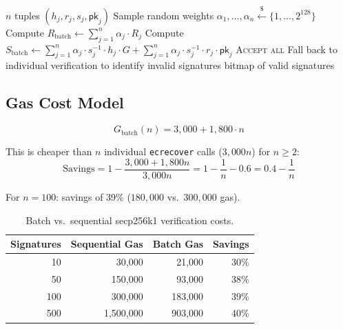\documentclass[11pt,a4paper]{article}
\begin{document}
\begin{algorithm}[H]
\caption{Secp256k1 Batch Signature Verification}
\label{alg:batch_ecdsa}
\begin{algorithmic}[1]
\Require $n$ tuples $(h_j, r_j, s_j, \mathsf{pk}_j)$
\State Sample random weights $\alpha_1, \ldots, \alpha_n \xleftarrow{\$} \{1, \ldots, 2^{128}\}$
\State Compute $R_{\text{batch}} \gets \sum_{j=1}^n \alpha_j \cdot R_j$ 
\State Compute $S_{\text{batch}} \gets \sum_{j=1}^n \alpha_j \cdot s_j^{-1} \cdot h_j \cdot G + \sum_{j=1}^n \alpha_j \cdot s_j^{-1} \cdot r_j \cdot \mathsf{pk}_j$
    \State \Return \textsc{Accept all}
\Else
    \State Fall back to individual verification to identify invalid signatures
    \State \Return bitmap of valid signatures
\EndIf
\end{algorithmic}
\end{algorithm}

\subsection{Gas Cost Model}

\begin{equation}
    G_{\text{batch}}(n) = 3{,}000 + 1{,}800 \cdot n
\end{equation}

This is cheaper than $n$ individual \texttt{ecrecover} calls ($3{,}000n$) for $n \geq 2$:
\begin{equation}
    \text{Savings} = 1 - \frac{3{,}000 + 1{,}800n}{3{,}000n} = 1 - \frac{1}{n} - 0.6 = 0.4 - \frac{1}{n}
\end{equation}

For $n = 100$: savings of 39\% ($180{,}000$ vs.\ $300{,}000$ gas).

\begin{table}[H]
\centering
\caption{Batch vs.\ sequential secp256k1 verification costs.}
\label{tab:batch_secp}
\begin{tabular}{rrrr}
\toprule
\textbf{Signatures} & \textbf{Sequential Gas} & \textbf{Batch Gas} & \textbf{Savings} \\
\midrule
10 & 30,000 & 21,000 & 30\% \\
50 & 150,000 & 93,000 & 38\% \\
100 & 300,000 & 183,000 & 39\% \\
500 & 1,500,000 & 903,000 & 40\% \\
\bottomrule
\end{tabular}
\end{table}
\end{document}
